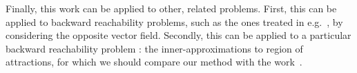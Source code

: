 \documentclass{sig-alternate-05-2015} %
\begin{document}

Finally, this work can be applied to other, related problems. First, this can be applied
to backward reachability problems, such as the ones treated in e.g.~\cite{underapprox16}, by considering
the opposite vector field. Secondly, this can be applied to a particular backward 
reachability problem : the inner-approximations to region
of attractions, for which we should compare our method with the work~\cite{DBLP:conf/nolcos/KordaHJ13}. 



\end{document}
